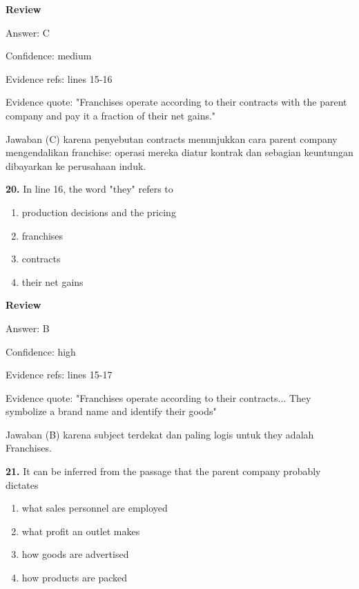 \documentclass[12pt]{article}
\begin{document}
\par
\begingroup
\setlength{\parskip}{0pt}
\setlength{\parindent}{0pt}
\textbf{Review}\par
Answer: C\par
Confidence: medium\par
Evidence refs: lines 15-16\par
Evidence quote: "Franchises operate according to their contracts with the parent company and pay it a fraction of their net gains."\par
Jawaban (C) karena penyebutan contracts menunjukkan cara parent company mengendalikan franchise: operasi mereka diatur kontrak dan sebagian keuntungan dibayarkan ke perusahaan induk.\par
\endgroup
\par
\vspace{0.25\baselineskip}
\noindent\textbf{20.} In line 16, the word "they" refers to
\begin{enumerate}[label=(\Alph*),leftmargin=*,itemsep=0.2em]
\item production decisions and the pricing
\item franchises
\item contracts
\item their net gains
\end{enumerate}
\par
\begingroup
\setlength{\parskip}{0pt}
\setlength{\parindent}{0pt}
\textbf{Review}\par
Answer: B\par
Confidence: high\par
Evidence refs: lines 15-17\par
Evidence quote: "Franchises operate according to their contracts... They symbolize a brand name and identify their goods"\par
Jawaban (B) karena subject terdekat dan paling logis untuk they adalah Franchises.\par
\endgroup
\par
\vspace{0.25\baselineskip}
\noindent\textbf{21.} It can be inferred from the passage that the parent company probably dictates
\begin{enumerate}[label=(\Alph*),leftmargin=*,itemsep=0.2em]
\item what sales personnel are employed
\item what profit an outlet makes
\item how goods are advertised
\item how products are packed
\end{enumerate}
\end{document}
